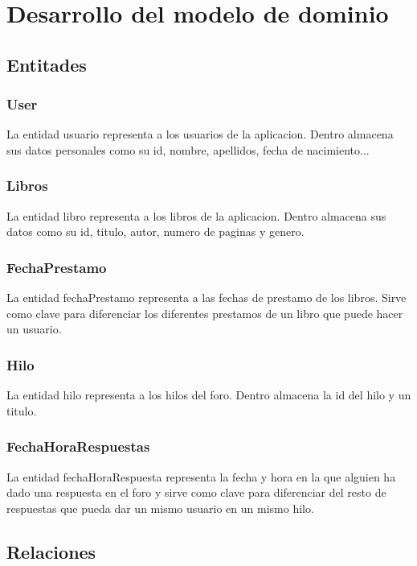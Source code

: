 ﻿\documentclass{report}
\begin{document}
        \section{Desarrollo del modelo de dominio}
            \subsection{Entitades}
                \subsubsection{User}
                    La entidad usuario representa a los usuarios de la aplicacion. Dentro almacena sus datos personales como su id, nombre, apellidos, fecha de nacimiento...
                \subsubsection{Libros}
                    La entidad libro representa a los libros de la aplicacion. Dentro almacena sus datos como su id, titulo, autor, numero de paginas y genero.
                \subsubsection{FechaPrestamo}
                    La entidad fechaPrestamo representa a las fechas de prestamo de los libros. Sirve como clave para diferenciar los diferentes prestamos de un libro que puede hacer un usuario.
                \subsubsection{Hilo}
                    La entidad hilo representa a los hilos del foro. Dentro almacena la id del hilo y un titulo.
                \subsubsection{FechaHoraRespuestas}
                    La entidad fechaHoraRespuesta representa la fecha y hora en la que alguien ha dado una respuesta en el foro y sirve como clave para diferenciar del resto de respuestas que pueda dar un mismo usuario en un mismo hilo.
            \clearpage
            \subsection{Relaciones}
\end{document}
